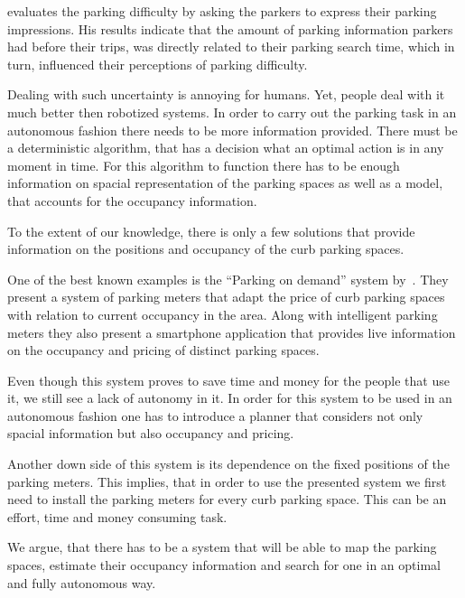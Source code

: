 \citet{rodrigue2013geography} evaluates the parking difficulty by asking the
parkers to express their parking impressions. His results indicate that the
amount of parking information parkers had before their trips, was directly
related to their parking search time, which in turn, influenced their
perceptions of parking difficulty.

Dealing with such uncertainty is annoying for humans. Yet, people deal with it
much better then robotized systems. In order to carry out the parking task in
an autonomous fashion there needs to be more information provided. There must
be a deterministic algorithm, that has a decision what an optimal action is in
any moment in time. For this algorithm to function there has to be enough
information on spacial representation of the parking spaces as well as a
model, that accounts for the occupancy information.

To the extent of our knowledge, there is only a few solutions that provide
information on the positions and occupancy of the curb parking spaces.

One of the best known examples is the ``Parking on demand'' system
by~\citet{sfo,sfo2}. They present a system of parking meters that adapt the
price of curb parking spaces with relation to current occupancy in the area.
Along with intelligent parking meters they also present a smartphone
application that provides live information on the occupancy and pricing of
distinct parking spaces.

Even though this system proves to save time and money for the people that use
it, we still see a lack of autonomy in it. In order for this system to be used
in an autonomous fashion one has to introduce a planner that considers not
only spacial information but also occupancy and pricing.

Another down side of this system is its dependence on the fixed positions of
the parking meters. This implies, that in order to use the presented system we
first need to install the parking meters for every curb parking space. This
can be an effort, time and money consuming task.

We argue, that there has to be a system that will be able to map the parking
spaces, estimate their occupancy information and search for one in an optimal
and fully autonomous way.

